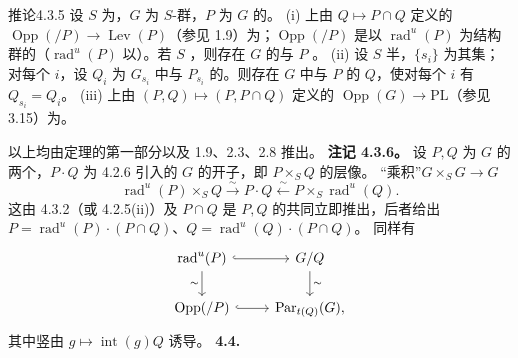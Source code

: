 \begin{SGAresult}{推论}{4.3.5}
设 $S$ 为，$G$ 为 $S$-群，$P$ 为 $G$ 的。
(i) 上由 $Q\mapsto P\cap Q$ 定义的 $\operatorname{Opp}(/P)\to\operatorname{Lev}(P)$（参见 1.9）为；$\operatorname{Opp}(/P)$ 是以 $\operatorname{rad}^{u}(P)$ 为结构群的（$\operatorname{rad}^{u}(P)$ 以）。若 $S$ ，则存在 $G$ 的与 $P$ 。
(ii) 设 $S$ 半，$\{s_i\}$ 为其集；对每个 $i$，设 $Q_i$ 为 $G_{s_i}$ 中与 $P_{s_i}$ 的。则存在 $G$ 中与 $P$ 的 $Q$，使对每个 $i$ 有 $Q_{s_i}=Q_i$。
(iii) 上由 $(P,Q)\mapsto(P,P\cap Q)$ 定义的 $\operatorname{Opp}(G)\to\mathrm{PL}$（参见 3.15）为。
\end{SGAresult}
以上均由定理的第一部分以及 1.9、2.3、2.8 推出。
\textbf{注记 4.3.6。} 设 $P,Q$ 为 $G$ 的两个，$P\cdot Q$ 为 4.2.6 引入的 $G$ 的开子，即 $P\times_SQ$ 的层像。
“乘积”$G\times_SG\to G$ 
\[\operatorname{rad}^{u}(P)\times_SQ\xrightarrow{\sim}P\cdot Q\xleftarrow{\sim}P\times_S\operatorname{rad}^{u}(Q).\]
这由 4.3.2（或 4.2.5(ii)）及 $P\cap Q$ 是 $P,Q$ 的共同立即推出，后者给出 $P=\operatorname{rad}^{u}(P)\cdot(P\cap Q)$、$Q=\operatorname{rad}^{u}(Q)\cdot(P\cap Q)$。
同样有
\[\begin{tikzcd}
\operatorname{rad}^{u}(P)\arrow[r,hook]\arrow[d,"\sim"']&G/Q\arrow[d,"\sim"]\\
\operatorname{Opp}(/P)\arrow[r,hook]&\operatorname{Par}_{t(Q)}(G),
\end{tikzcd}\]
其中竖由 $g\mapsto\operatorname{int}(g)Q$ 诱导。
\textbf{4.4. }
